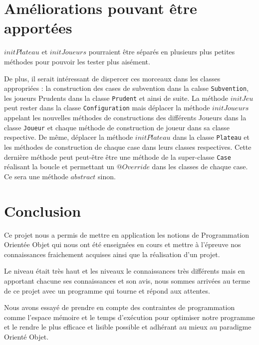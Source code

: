 \documentclass[11pt, a4paper]{report}
\begin{document}
	\chapter{Améliorations pouvant être apportées}
	
	$initPlateau$ et $initJoueurs$ pourraient être séparés en plusieurs plus petites méthodes pour pouvoir les tester plus aisément.
	
	De plus, il serait intéressant de dispercer ces morceaux dans les classes appropriées : la construction des cases de subvention dans la calsse \verb*|Subvention|, les joueurs Prudents dans la classe \verb*|Prudent| et ainsi de suite. La méthode $initJeu$ peut rester dans la classe \verb*|Configuration| mais déplacer la méthode $initJoueurs$ appelant les nouvelles méthodes de constructions des différents Joueurs dans la classe \verb*|Joueur| et chaque méthode de construction de joueur dans sa classe respective. De même, déplacer la méthode $initPlateau$ dans la classe \verb*|Plateau| et les méthodes de construction de chaque case dans leurs classes respectives. Cette dernière méthode peut peut-être être une méthode de la super-classe \verb*|Case| réalisant la boucle et permettant un $@Override$ dans les classes de chaque case. Ce sera une méthode $abstract$ sinon.
	
	
	\chapter*{Conclusion}
	
	Ce projet nous a permis de mettre en application les notions de Programmation Orientée Objet qui nous ont été enseignées en cours et mettre à l'épreuve nos connaissances fraichement acquises ainsi que la réalisation d'un projet.
	
	Le niveau était très haut et les niveaux le connaissances très différents mais en apportant chacune ses connaissances et son avis, nous sommes arrivées au terme de ce projet avec un programme qui tourne et répond aux attentes.
	
	Nous avons essayé de prendre en compte des contraintes de programmation comme l'espace mémoire et le temps d'exécution pour optimiser notre programme et le rendre le plus efficace et lisible possible et adhérant au mieux au paradigme Orienté Objet.
	
	
\end{document}
